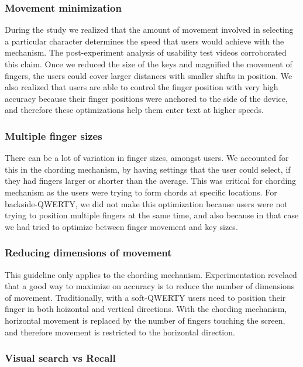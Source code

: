 \subsubsection{Movement minimization}

During the study we realized that the amount of movement involved in selecting a particular character determines the speed that users would achieve with the mechanism. The post-experiment analysis of usability test videos corroborated this claim. Once we reduced the size of the keys and magnified the movement of fingers, the users could cover larger distances with smaller shifts in position. We also realized that users are able to control the finger position with very high accuracy because their finger positions were anchored to the side of the device, and therefore these optimizations help them enter text at higher speeds.

\subsubsection{Multiple finger sizes}

There can be a lot of variation in finger sizes, amongst users. We accounted for this in the chording mechanism, by having settings that the user could select, if they had fingers larger or shorter than the average. This was critical for chording mechanism as the users were trying to form chords at specific locations. For backside-QWERTY, we did not make this optimization because users were not trying to position multiple fingers at the same time, and also because in that case we had tried to optimize between finger movement and key sizes.

\subsubsection{Reducing dimensions of movement}

This guideline only applies to the chording mechanism.
Experimentation revelaed that a good way to maximize on accuracy is to
reduce the number of dimensions of movement. Traditionally, with a
soft-QWERTY users need to position their finger in both hoizontal and
vertical directions. With the chording mechanism, horizontal movement
is replaced by the number of fingers touching the screen, and
therefore movement is restricted to the horizontal direction.

\subsubsection{Visual search vs Recall}


